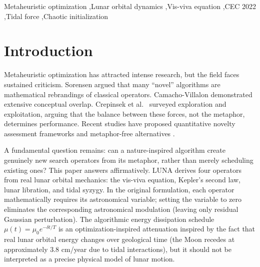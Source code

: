 \documentclass[review]{elsarticle}
\theoremstyle{definition}
\begin{document}
\begin{frontmatter}
\begin{abstract}
generations (2017, 2022, 2025). Post-hoc Holm-Bonferroni analysis, a Nemenyi critical-difference diagram, and a Dolan--Mor\'e empirical cumulative distribution function (ECDF) analysis corroborate the rankings.
\end{abstract}

\begin{keyword}
Metaheuristic optimization \sep Lunar orbital dynamics \sep Vis-viva equation \sep CEC 2022 \sep Tidal force \sep Chaotic initialization
\end{keyword}
\end{frontmatter}

\section{Introduction}
\label{sec:intro}

Metaheuristic optimization has attracted intense research, but the field faces sustained criticism. Sorensen \cite{5} argued that many ``novel'' algorithms are mathematical rebrandings of classical operators. Camacho-Villalon \cite{6} demonstrated extensive conceptual overlap. Crepinsek et al.\ \cite{24} surveyed exploration and exploitation, arguing that the balance between these forces, not the metaphor, determines performance. Recent studies \cite{14,15,16,17b,17c} have proposed quantitative novelty assessment frameworks and metaphor-free alternatives \cite{17d}.

A fundamental question remains: can a nature-inspired algorithm create genuinely new search operators from its metaphor, rather than merely scheduling existing ones? This paper answers affirmatively. LUNA derives four operators from real lunar orbital mechanics: the vis-viva equation, Kepler's second law, lunar libration, and tidal syzygy. In the original formulation, each operator mathematically requires its astronomical variable; setting the variable to zero eliminates the corresponding astronomical modulation (leaving only residual Gaussian perturbation). The algorithmic energy dissipation schedule $\mu(t) = \mu_0 e^{-\delta t/T}$ is an optimization-inspired attenuation inspired by the fact that real lunar orbital energy changes over geological time (the Moon recedes at approximately 3.8 cm/year due to tidal interactions), but it should not be interpreted as a precise physical model of lunar motion.
\end{document}

